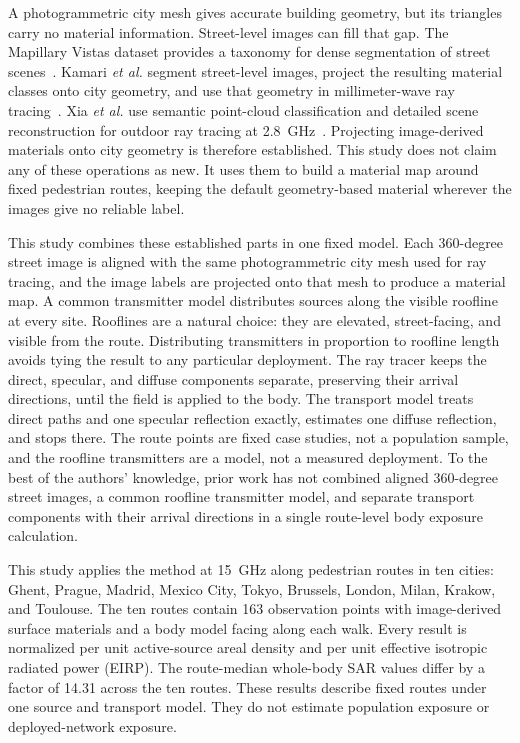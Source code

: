\documentclass{ieeeaccess}
\begin{document}
A photogrammetric city mesh gives accurate building geometry, but its triangles
carry no material information. Street-level images can fill that gap. The
Mapillary Vistas dataset provides a taxonomy for dense segmentation of street
scenes~\cite{vistas}. Kamari \emph{et al.} segment street-level images, project
the resulting material classes onto city geometry, and use that geometry in
millimeter-wave ray tracing~\cite{mmsv}. Xia \emph{et al.} use semantic
point-cloud classification and detailed scene reconstruction for outdoor ray
tracing at 2.8~GHz~\cite{xia2024}. Projecting image-derived materials onto
city geometry is therefore established. This study does not claim any of these
operations as new. It uses them to build a material map around fixed pedestrian
routes, keeping the default geometry-based material wherever the images give no
reliable label.

This study combines these established parts in one fixed model. Each 360-degree
street image is aligned with the same photogrammetric city mesh used for ray
tracing, and the image labels are projected onto that mesh to produce a material map. A common transmitter model distributes sources along the visible
roofline at every site. Rooflines are a natural choice: they are elevated, street-facing, and visible
from the route. Distributing transmitters in proportion to roofline length
avoids tying the result to any particular deployment. The ray tracer keeps the direct, specular, and diffuse components separate,
preserving their arrival directions, until the field is applied to the body. The transport model treats direct paths and one
specular reflection exactly, estimates one diffuse reflection, and stops there.
The route points are fixed case studies, not a population sample, and the
roofline transmitters are a model, not a measured deployment. To the best of the authors' knowledge, prior work has not combined aligned
360-degree street images, a common roofline transmitter model, and separate
transport components with their arrival directions in a single route-level body
exposure calculation.

This study applies the method at 15~GHz along pedestrian routes in ten cities:
Ghent, Prague, Madrid, Mexico City, Tokyo, Brussels, London, Milan, Krakow, and
Toulouse. The ten routes contain 163 observation points with image-derived
surface materials and a body model facing along each walk. Every result is
normalized per unit active-source areal density and per unit effective isotropic
radiated power (EIRP). The route-median whole-body SAR values differ by a factor
of 14.31 across the ten routes. These results describe fixed routes under one
source and transport model. They do not estimate population exposure or
deployed-network exposure.
\end{document}
